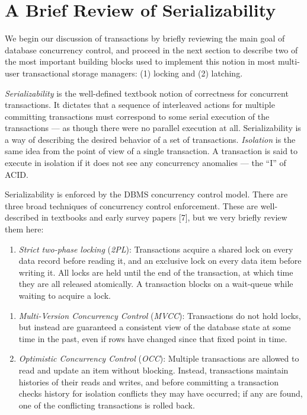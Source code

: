 \documentclass[a4paper,11pt,twoside,openright]{book}
\begin{document}
\hypertarget{a-brief-review-of-serializability}{%
\section{A Brief Review of
Serializability}\label{a-brief-review-of-serializability}}

We begin our discussion of transactions by briefly reviewing the main
goal of database concurrency control, and proceed in the next section to
describe two of the most important building blocks used to implement
this notion in most multi-user transactional storage managers:
(1) locking and (2) latching.

\emph{Serializability} is the well-defined textbook notion of
correctness for concurrent transactions. It dictates that a sequence of
interleaved actions for multiple committing transactions must correspond
to some serial execution of the transactions --- as though there were no
parallel execution at all. Serializability is a way of describing the
desired behavior of a set of transactions. \emph{Isolation} is the same
idea from the point of view of a single transaction. A transaction is
said to execute in isolation if it does not see any concurrency
anomalies --- the ``I'' of ACID.

Serializability is enforced by the DBMS concurrency control model. There
are three broad techniques of concurrency control enforcement. These are
well-described in textbooks and early survey papers {[}7{]}, but we very
briefly review them here:

\begin{enumerate}
\def\labelenumi{\arabic{enumi}.}

\item
  \emph{Strict two-phase locking} (\emph{2PL}): Transactions acquire a
  shared lock on every data record before reading it, and an exclusive
  lock on every data item before writing it. All locks are held until
  the end of the transaction, at which time they are all released
  atomically. A transaction blocks on a wait-queue while waiting to
  acquire a lock.
\end{enumerate}

\begin{enumerate}
\def\labelenumi{\arabic{enumi}.}
\setcounter{enumi}{1}
\item
  \emph{Multi-Version Concurrency Control} (\emph{MVCC}): Transactions
  do not hold locks, but instead are guaranteed a consistent view of the
  database state at some time in the past, even if rows have changed
  since that fixed point in time.
\item
  \emph{Optimistic Concurrency Control} (\emph{OCC}): Multiple
  transactions are allowed to read and update an item without blocking.
  Instead, transactions maintain histories of their reads and writes,
  and before committing a transaction checks history for isolation
  conflicts they may have occurred; if any are found, one of the
  conflicting transactions is rolled back.
\end{enumerate}
\end{document}
